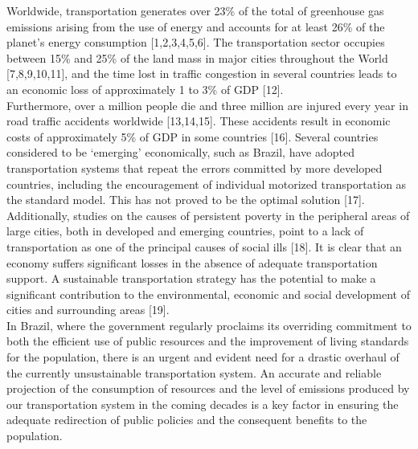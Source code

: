 \begin{kaobox}[frametitle= Excerpt from \sidecite{maciel_energy_2012} (reprinted under a CC-BY-4.0), backgroundcolor=Goldenrod!45!white,frametitlebackgroundcolor=Goldenrod!45!white]
Worldwide, transportation generates over 23\% of the total of greenhouse gas emissions arising from the use of energy and accounts for at least 26\% of the planet's energy consumption [1,2,3,4,5,6]. The transportation sector occupies between 15\% and 25\% of the land mass in major cities throughout the World [7,8,9,10,11], and the time lost in traffic congestion in several countries leads to an economic loss of approximately 1 to 3\% of GDP [12].\\

Furthermore, over a million people die and three million are injured every year in road traffic accidents worldwide [13,14,15]. These accidents result in economic costs of approximately 5\% of GDP in some countries [16]. Several countries considered to be `emerging' economically, such as Brazil, have adopted transportation systems that repeat the errors committed by more developed countries, including the encouragement of individual motorized transportation as the standard model. This has not proved to be the optimal solution [17].\\

Additionally, studies on the causes of persistent poverty in the peripheral areas of large cities, both in developed and emerging countries, point to a lack of transportation as one of the principal causes of social ills [18]. It is clear that an economy suffers significant losses in the absence of adequate transportation support. A sustainable transportation strategy has the potential to make a significant contribution to the environmental, economic and social development of cities and surrounding areas [19].\\

In Brazil, where the government regularly proclaims its overriding commitment to both the efficient use of public resources and the improvement of living standards for the population, there is an urgent and evident need for a drastic overhaul of the currently unsustainable transportation system. An accurate and reliable projection of the consumption of resources and the level of emissions produced by our transportation system in the coming decades is a key factor in ensuring the adequate redirection of public policies and the consequent benefits to the population.
\end{kaobox}

